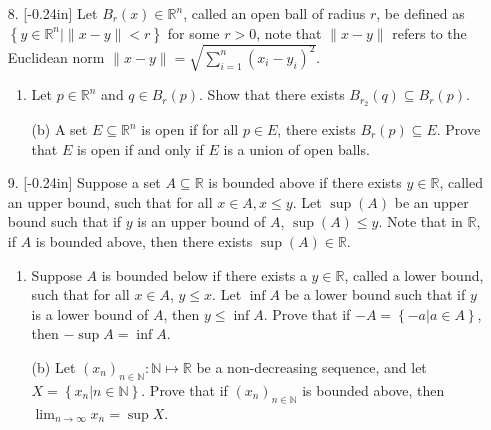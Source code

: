 \documentclass[letterpaper,12pt]{article}
\newcommand{\set}[1]{\left\{ #1 \right\}}
\theoremstyle{definition}
\begin{document}
\pagebreak
\begin{enumerate}
    \item[8.] \reversemarginpar{}[-0.24in] 
 Let $B_r(x) \in \mathbb{R}^n$, called an open ball of radius $r$, be defined as $\set{y \in \mathbb{R}^n | \| x-y \| < r}$ for some $r > 0$, note that $\| x-y \|$ refers to the Euclidean norm $\| x-y \| = \sqrt{\sum_{i=1}^n (x_i - y_i)^2}$. \begin{enumerate}
        \item Let $p \in \mathbb{R}^n$ and $q \in B_r(p)$. Show that there exists $B_{r_2}(q) \subseteq B_r(p)$.
    \end{enumerate}
\end{enumerate}
\pagebreak
\begin{enumerate}
    \item[] \begin{enumerate}
        \item[(b)] A set $E \subseteq \mathbb{R}^n$ is open if for all $p \in E$, there exists $B_r(p) \subseteq E$. Prove that $E$ is open if and only if $E$ is a union of open balls.
    \end{enumerate}
\end{enumerate}
\pagebreak
\begin{enumerate}
    \item[9.] \reversemarginpar{}[-0.24in] 
Suppose a set $A \subseteq \mathbb{R}$ is bounded above if there exists $y \in \mathbb{R}$, called an upper bound, such that for all $x \in A, x \leq y$. Let $\sup (A)$ be an upper bound such that if $y$ is an upper bound of $A$, $\sup (A) \leq y$. Note that in $\mathbb{R}$, if $A$ is bounded above, then there exists $\sup (A) \in \mathbb{R}$. \begin{enumerate}
    \item Suppose $A$ is bounded below if there exists a $y \in \mathbb{R}$, called a lower bound, such that for all $x \in A$, $y \leq x$. Let $\inf A$ be a lower bound such that if $y$ is a lower bound of $A$, then $y \leq \inf A$. Prove that if $-A = \set{-a | a \in A}$, then $-\sup A = \inf A$. 
\end{enumerate}
\end{enumerate}
\pagebreak
\begin{enumerate}
   \item[] \begin{enumerate}
       \item[(b)] Let $(x_n)_{n\in\mathbb{N}} : \mathbb{N} \mapsto \mathbb{R}$ be a non-decreasing sequence, and let $X= \set{x_n | n \in \mathbb{N}}$. Prove that if $(x_n)_{n\in\mathbb{N}}$ is bounded above, then $\lim_{n \rightarrow \infty} x_n = \sup X$.
   \end{enumerate}
\end{enumerate}
\end{document}
